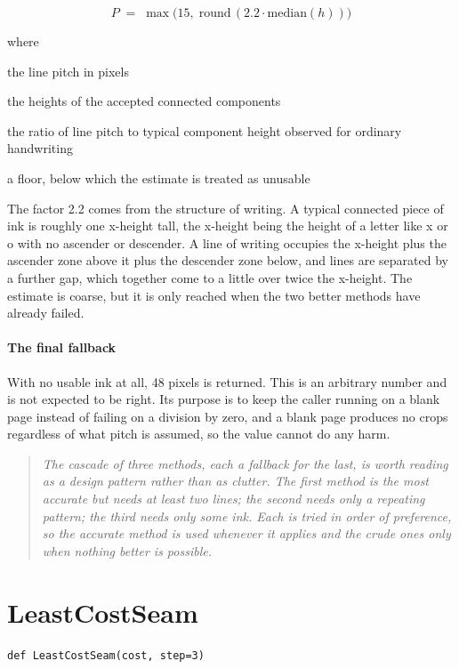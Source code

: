 \begin{equation}
P \;=\; \max\big(15,\; \mathrm{round}\,(2.2 \cdot \mathrm{median}(h))\big)
\end{equation}

\noindent where
\begin{description}[leftmargin=2.4em,style=nextline,font=\normalfont\ttfamily]\setlength\itemsep{1pt}
  \item[{$P$}] \normalfont the line pitch in pixels
  \item[{$h$}] \normalfont the heights of the accepted connected components
  \item[{$2.2$}] \normalfont the ratio of line pitch to typical component height observed for ordinary handwriting
  \item[{$15$}] \normalfont a floor, below which the estimate is treated as unusable
\end{description}
The factor 2.2 comes from the structure of writing. A typical connected piece of ink is roughly one x-height tall, the x-height being the height of a letter like x or o with no ascender or descender. A line of writing occupies the x-height plus the ascender zone above it plus the descender zone below, and lines are separated by a further gap, which together come to a little over twice the x-height. The estimate is coarse, but it is only reached when the two better methods have already failed.


\paragraph{The final fallback}
With no usable ink at all, 48 pixels is returned. This is an arbitrary number and is not expected to be right. Its purpose is to keep the caller running on a blank page instead of failing on a division by zero, and a blank page produces no crops regardless of what pitch is assumed, so the value cannot do any harm.


\begin{quote}\small\itshape The cascade of three methods, each a fallback for the last, is worth reading as a design pattern rather than as clutter. The first method is the most accurate but needs at least two lines; the second needs only a repeating pattern; the third needs only some ink. Each is tried in order of preference, so the accurate method is used whenever it applies and the crude ones only when nothing better is possible.\end{quote}

\section{LeastCostSeam}
\begin{lstlisting}[style=sig]
def LeastCostSeam(cost, step=3)
\end{lstlisting}


